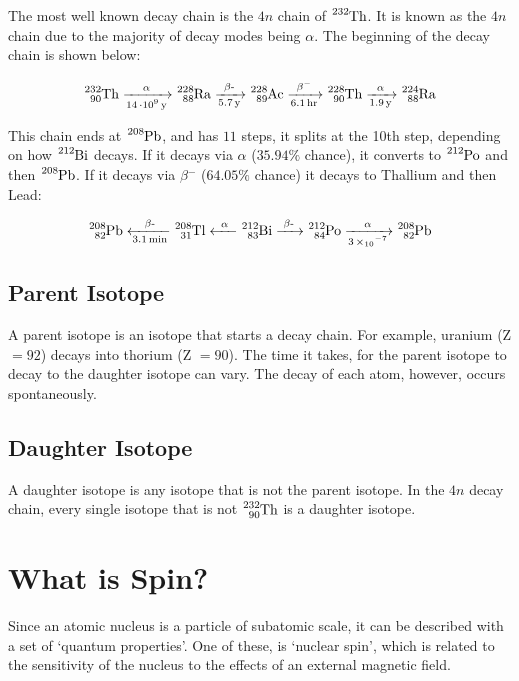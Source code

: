\documentclass{article}
\begin{document}
\begin{multicols*}{2}
    The most well known decay chain is the $4n$ chain of $\ce{^{232}Th}$. It is known
    as the $4n$ chain due to the majority of decay modes being $\alpha$. The beginning
    of the decay chain is shown below:

    \begin{equation*}
      \begin{split}
        \ce{^{232}_{90}Th ->[\alpha][14\cdot{10^{9}} y] ^{228}_{88}Ra
          ->[\beta{-}][5.7 y] ^{228}_{89}Ac ->[\beta-][6.1 hr] ^{228}_{90}Th
          ->[\alpha][1.9 y] ^{224}_{88}Ra}
      \end{split}
    \end{equation*}

    This chain ends at $\ce{^{208}Pb}$, and has $11$ steps, it splits at the
    10th step, depending
    on how $\ce{^{212}Bi}$ decays. If it decays via $\alpha$ ($35.94\%$ chance),
    it converts to $\ce{^{212}Po}$ and then $\ce{^{208}Pb}$. If it decays via
    $\beta{^{-}}$ ($64.05\%$ chance) it decays to Thallium and then Lead:

    \begin{equation*}
      \begin{split}
        \ce{^{208}_{82}Pb <-[\beta{-}][3.1 min] ^{208}_{31}Tl <-[\alpha] ^{212}_{83}Bi
            ->[\beta{-}] ^{212}_{84}Po ->[\alpha][3 \times 10^{-7}]
            ^{208}_{82}Pb}
      \end{split}
    \end{equation*}

    \subsection{Parent Isotope}
    A parent isotope is an isotope that starts a decay chain. For example, uranium
    (Z $=92$) decays into thorium (Z $=90$). The time it takes, for the parent isotope
    to decay to the daughter isotope can vary. The decay of each atom, however, occurs
    spontaneously.

    \subsection{Daughter Isotope}
    A daughter isotope is any isotope that is not the parent isotope. In the $4n$ decay
    chain, every single isotope that is not $\ce{^{232}_{90}Th}$ is a daughter isotope. 

    \section{What is Spin?}
    Since an atomic nucleus is a particle of subatomic scale, it can be
    described with a set of `quantum properties'. One of these, is `nuclear
    spin', which is related to the sensitivity of the nucleus to the effects
    of an external magnetic field.\\


\end{multicols*}
\end{document}
